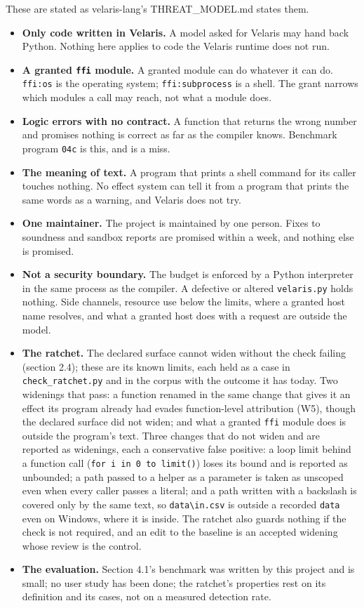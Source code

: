 \documentclass[
]{article}
\providecommand{\tightlist}{%
  \setlength{\itemsep}{0pt}\setlength{\parskip}{0pt}}
\begin{document}
These are stated as velaris-lang's THREAT\_MODEL.md states them.

\begin{itemize}
\tightlist
\item
  \textbf{Only code written in Velaris.} A model asked for Velaris may
  hand back Python. Nothing here applies to code the Velaris runtime
  does not run.
\item
  \textbf{A granted \texttt{ffi} module.} A granted module can do
  whatever it can do. \texttt{ffi:os} is the operating system;
  \texttt{ffi:subprocess} is a shell. The grant narrows which modules a
  call may reach, not what a module does.
\item
  \textbf{Logic errors with no contract.} A function that returns the
  wrong number and promises nothing is correct as far as the compiler
  knows. Benchmark program \texttt{04c} is this, and is a miss.
\item
  \textbf{The meaning of text.} A program that prints a shell command
  for its caller touches nothing. No effect system can tell it from a
  program that prints the same words as a warning, and Velaris does not
  try.
\item
  \textbf{One maintainer.} The project is maintained by one person.
  Fixes to soundness and sandbox reports are promised within a week, and
  nothing else is promised.
\item
  \textbf{Not a security boundary.} The budget is enforced by a Python
  interpreter in the same process as the compiler. A defective or
  altered \texttt{velaris.py} holds nothing. Side channels, resource use
  below the limits, where a granted host name resolves, and what a
  granted host does with a request are outside the model.
\item
  \textbf{The ratchet.} The declared surface cannot widen without the
  check failing (section 2.4); these are its known limits, each held as
  a case in \texttt{check\_ratchet.py} and in the corpus with the
  outcome it has today. Two widenings that pass: a function renamed in
  the same change that gives it an effect its program already had evades
  function-level attribution (W5), though the declared surface did not
  widen; and what a granted \texttt{ffi} module does is outside the
  program's text. Three changes that do not widen and are reported as
  widenings, each a conservative false positive: a loop limit behind a
  function call (\texttt{for\ i\ in\ 0\ to\ limit()}) loses its bound
  and is reported as unbounded; a path passed to a helper as a parameter
  is taken as unscoped even when every caller passes a literal; and a
  path written with a backslash is covered only by the same text, so
  \texttt{data\textbackslash{}in.csv} is outside a recorded
  \texttt{data} even on Windows, where it is inside. The ratchet also
  guards nothing if the check is not required, and an edit to the
  baseline is an accepted widening whose review is the control.
\item
  \textbf{The evaluation.} Section 4.1's benchmark was written by this
  project and is small; no user study has been done; the ratchet's
  properties rest on its definition and its cases, not on a measured
  detection rate.
\end{itemize}
\end{document}
